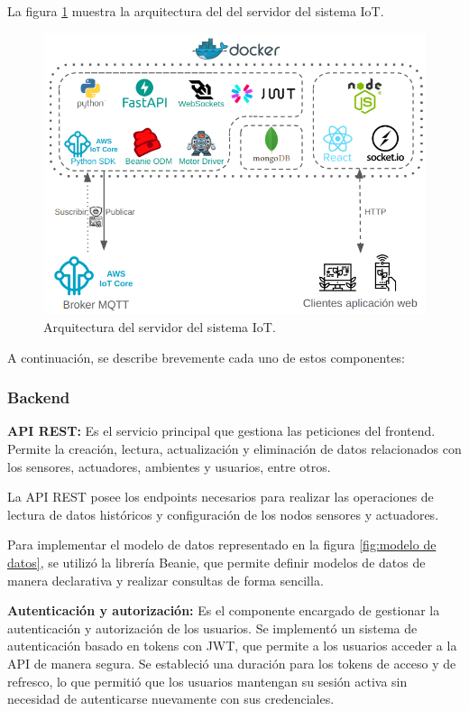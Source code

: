 La figura \ref{fig:arquitectura servidor} muestra la arquitectura del del
servidor del sistema IoT.

\begin{figure}[H]
    \centering
    \includegraphics[width=.97\textwidth]{./Images/16.png}
    \caption{Arquitectura del servidor del sistema IoT.}
    \label{fig:arquitectura servidor}
\end{figure}

A continuación, se describe brevemente cada uno de estos componentes:

\subsubsection{Backend}


\textbf{API REST:} Es el servicio principal que gestiona las peticiones del frontend. Permite la
creación, lectura, actualización y eliminación de datos relacionados con los
sensores, actuadores, ambientes y usuarios, entre otros.

La API REST posee los endpoints necesarios para realizar las operaciones de
lectura de datos históricos y configuración de los nodos sensores y actuadores.

Para implementar el modelo de datos representado en la figura \ref{fig:modelo
    de datos}, se utilizó la librería Beanie, que permite definir modelos de datos
de manera declarativa y realizar consultas de forma sencilla.

\textbf{Autenticación y autorización:} Es el componente encargado de gestionar
la autenticación y autorización de los usuarios. Se implementó un sistema de
autenticación basado en tokens con JWT, que permite a los usuarios acceder a la
API de manera segura. Se estableció una duración para los tokens de acceso y de
refresco, lo que permitió que los usuarios mantengan su sesión activa sin
necesidad de autenticarse nuevamente con sus credenciales.

